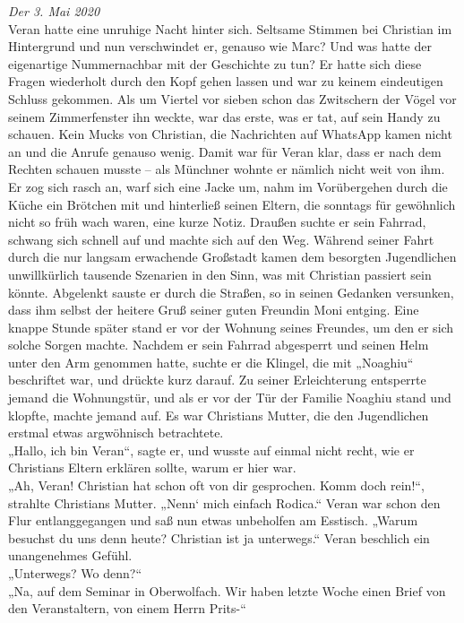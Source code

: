 \documentclass[oneside]{memoir}
\begin{document}
\textit{Der 3. Mai 2020} \\
Veran hatte eine unruhige Nacht hinter sich. Seltsame Stimmen bei Christian im Hintergrund und nun verschwindet er, genauso wie Marc? Und was hatte der eigenartige Nummernachbar mit der Geschichte zu tun? Er hatte sich diese Fragen wiederholt durch den Kopf gehen lassen und war zu keinem eindeutigen Schluss gekommen. Als um Viertel vor sieben schon das Zwitschern der Vögel vor seinem Zimmerfenster ihn weckte, war das erste, was er tat, auf sein Handy zu schauen. Kein Mucks von Christian, die Nachrichten auf WhatsApp kamen nicht an und die Anrufe genauso wenig. Damit war für Veran klar, dass er nach dem Rechten schauen musste -- als Münchner wohnte er nämlich nicht weit von ihm. Er zog sich rasch an, warf sich eine Jacke um, nahm im Vorübergehen durch die Küche ein Brötchen mit und hinterließ seinen Eltern, die sonntags für gewöhnlich nicht so früh wach waren, eine kurze Notiz. Draußen suchte er sein Fahrrad, schwang sich schnell auf und machte sich auf den Weg. Während seiner Fahrt durch die nur langsam erwachende Großstadt kamen dem besorgten Jugendlichen unwillkürlich tausende Szenarien in den Sinn, was mit Christian passiert sein könnte. Abgelenkt sauste er durch die Straßen, so in seinen Gedanken versunken, dass ihm selbst der heitere Gruß seiner guten Freundin Moni entging. Eine knappe Stunde später stand er vor der Wohnung seines Freundes, um den er sich solche Sorgen machte. Nachdem er sein Fahrrad abgesperrt und seinen Helm unter den Arm genommen hatte, suchte er die Klingel, die mit „Noaghiu“ beschriftet war, und drückte kurz darauf. Zu seiner Erleichterung entsperrte jemand die Wohnungstür, und als er vor der Tür der Familie Noaghiu stand und klopfte, machte jemand auf. Es war Christians Mutter, die den Jugendlichen erstmal etwas argwöhnisch betrachtete. \\
„Hallo, ich bin Veran“, sagte er, und wusste auf einmal nicht recht, wie er Christians Eltern erklären sollte, warum er hier war. \\
„Ah, Veran! Christian hat schon oft von dir gesprochen. Komm doch rein!“, strahlte Christians Mutter. „Nenn‘ mich einfach Rodica.“ Veran war schon den Flur entlanggegangen und saß nun etwas unbeholfen am Esstisch. „Warum besuchst du uns denn heute? Christian ist ja unterwegs.“
Veran beschlich ein unangenehmes Gefühl. \\
„Unterwegs? Wo denn?“ \\
„Na, auf dem Seminar in Oberwolfach. Wir haben letzte Woche einen Brief von den Veranstaltern, von einem Herrn Prits-“ \\
\end{document}
